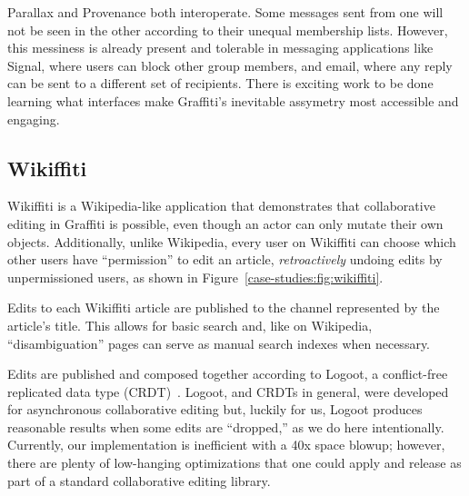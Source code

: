 
Parallax and Provenance both interoperate.
Some messages sent from one will not be seen in the other
according to their unequal membership lists. However, this messiness is already present and tolerable
in messaging applications like Signal, where users can block other group members,
and email, where any reply can be sent to a different set of recipients.
There is exciting work to be done learning what interfaces make
Graffiti's inevitable assymetry most accessible and engaging.




\subsection{Wikiffiti}

Wikiffiti is a Wikipedia-like application that demonstrates that
collaborative editing in Graffiti is possible,
even though an actor can only mutate their own objects.
Additionally, unlike Wikipedia,
every user on Wikiffiti can choose which other users have ``permission'' to edit an article,
\emph{retroactively} undoing edits by unpermissioned users,
as shown in Figure~\ref{case-studies:fig:wikiffiti}.

Edits to each Wikiffiti article are published to
the channel represented by the article's title.
This allows for basic search and, like on Wikipedia,
``disambiguation'' pages can serve as manual search indexes when necessary.

Edits are published and composed together according to Logoot,
a conflict-free replicated data type (CRDT)~\cite{logoot,crdts}.
Logoot, and CRDTs in general, were developed for asynchronous collaborative editing
but, luckily for us, Logoot produces reasonable results when
some edits are ``dropped,'' as we do here intentionally.
Currently, our implementation is inefficient with a 40x space blowup;
however, there are plenty of low-hanging optimizations that one could apply
and release as part of a standard collaborative editing library.

